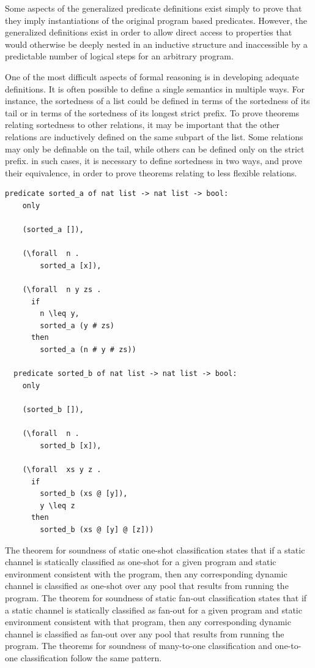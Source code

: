 \documentclass{article}
\begin{document}
Some aspects of the generalized predicate definitions exist simply to prove that they imply
instantiations of the original program based predicates. However, the generalized
definitions exist in order to allow direct access to properties that would
otherwise be deeply nested
in an inductive structure and inaccessible by a predictable number of
logical steps for an arbitrary
program.

One of the most difficult aspects of formal reasoning is in developing adequate definitions.
It is often possible to define a single semantics in multiple ways.
For instance, the sortedness of a list could be defined in terms of the sortedness of its tail
or in terms of the sortedness of its longest strict prefix. To prove theorems relating
sortedness to other relations, it may be important that the other relations are inductively
defined on the same subpart of the list. Some relations may only be definable on the tail,
while others can be defined only on the strict prefix. in such cases, it is necessary to
define sortedness in two ways, and prove their equivalence, in order to prove theorems relating
to less flexible relations.

\begin{lstlisting}[language=logic, mathescape]
  predicate sorted_a of nat list -> nat list -> bool:
    only

    (sorted_a []),

    (\forall  n .
        sorted_a [x]),

    (\forall  n y zs .
      if 
        n \leq y,
        sorted_a (y # zs)
      then
        sorted_a (n # y # zs))

  predicate sorted_b of nat list -> nat list -> bool:
    only

    (sorted_b []),

    (\forall  n .
        sorted_b [x]),

    (\forall  xs y z .
      if 
        sorted_b (xs @ [y]),
        y \leq z 
      then
        sorted_b (xs @ [y] @ [z]))
  \end{lstlisting}

The theorem for soundness of static one-shot classification states that if a static channel is
statically classified as one-shot for a given program and
static environment consistent with the
program, then any corresponding dynamic channel is classified
as one-shot over any pool that results
from running the program. The theorem for soundness of
static fan-out classification states that if
a static channel is statically classified as fan-out for a given program and static environment
consistent with that program, then any corresponding dynamic channel is classified as fan-out
over any pool that results from running the program.  The theorems for soundness of many-to-one
classification and one-to-one classification follow the same pattern. 
\end{document}
